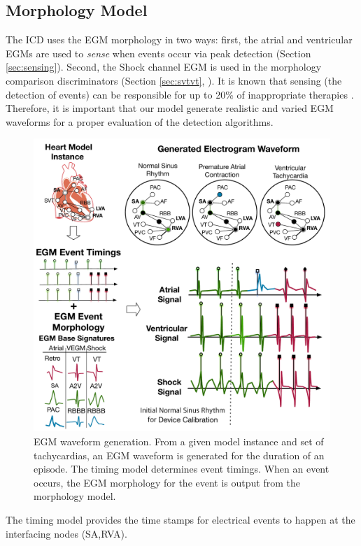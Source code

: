 \subsection{Morphology Model}
The ICD uses the EGM morphology in two ways:
first, the atrial and ventricular EGMs are used to \emph{sense} when events occur via peak detection (Section \ref{sec:sensing}).
Second, the Shock channel EGM is used in the morphology comparison discriminators (Section \ref{sec:svtvt}, \cite{VTC,Wavelet}).
It is known that sensing (the detection of events) can be responsible for up to 20\% of inappropriate therapies \cite{wrong_sensing}.
Therefore, it is important that our model generate realistic and varied EGM waveforms for a proper evaluation of the detection algorithms.

\begin{figure}[t]
	\centering
	\includegraphics[scale=0.4]{figures/figEGMGeneration1column.pdf}
	\caption{\small EGM waveform generation.
		From a given model instance and set of tachycardias, an EGM waveform is generated for the duration of an episode. The timing model determines event timings. When an event occurs, the EGM morphology for the event is output from the morphology model.  
		}
	\label{fig:egmGeneration}
\end{figure}
The timing model provides the time stamps for electrical events to happen at the interfacing nodes (SA,RVA). 
